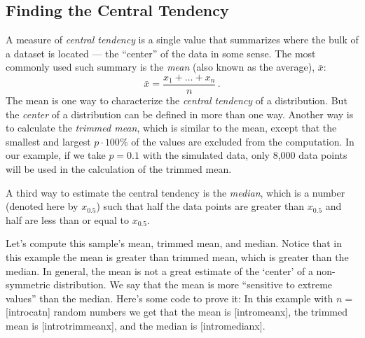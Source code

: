 \subsection{Finding the Central Tendency}
A measure of \emph{central tendency} is a single value that summarizes where the
bulk of a dataset is located --- the ``center'' of the data in some sense.
The most commonly used such summary is the \emph{mean} (also known
as the average), $\bar{x}$:\\
$$\bar{x}=\frac{x_1+\ldots+x_n}{n}\,.$$
The mean is one way to characterize the \emph{central tendency} of a distribution.
But the \emph{center} of a distribution can be defined in more than one way.
Another way is to calculate the \emph{trimmed mean}, which is similar to the mean,
except that the smallest and largest $p\cdot 100\%$  of the values are excluded
from the computation. In our example, if we take $p=0.1$ with the simulated data,
only 8,000 data points will be used in the calculation of the trimmed mean. 


A third way to estimate the central tendency is the \emph{median}, which is a
number (denoted here by $x_{0.5}$) such that half the data points are greater
than $x_{0.5}$ and half are less than or equal to $x_{0.5}$. 


Let's compute this sample's mean, trimmed mean, and median. Notice that
in this example the mean is greater than trimmed mean, which is greater than
the median. In general, the mean is not a great estimate of the `center' of a
non-symmetric distribution. We say that the mean is more ``sensitive to extreme
values'' than the median. Here's some code to prove it:
In this example with $n=$ [introcatn] random numbers we
get that the mean
is [intromeanx], the trimmed mean is
[introtrimmeanx], and the median is
[intromedianx].


